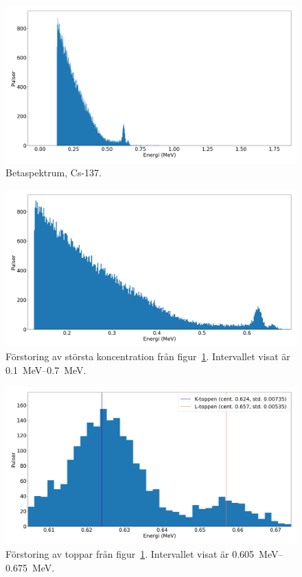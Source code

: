 \begin{figure}[!hp]
    \centering
    \includegraphics[width=\textwidth, keepaspectratio]{../images/cesium.png}
    \caption{Betaspektrum, Cs-137.}
    \label{fig:cesium}
\end{figure}

\begin{figure}[!hp]
    \centering
    \includegraphics[width=\textwidth, keepaspectratio]{../images/cesium_zoom.png}
    \caption{
        Förstoring av största koncentration från figur~\ref{fig:cesium}.
        Intervallet visat är \qtyrange{0.1}{0.7}{\MeV}.
    }
    \label{fig:cesiumzoom}
\end{figure}

\begin{figure}[!hp]
    \centering
    \includegraphics[width=\textwidth, keepaspectratio]{../images/cesium_top.png}
    \caption{
        Förstoring av toppar från figur~\ref{fig:cesium}.
        Intervallet visat är \qtyrange{0.605}{0.675}{\MeV}.
    }
    \label{fig:cesiumtop}
\end{figure}

